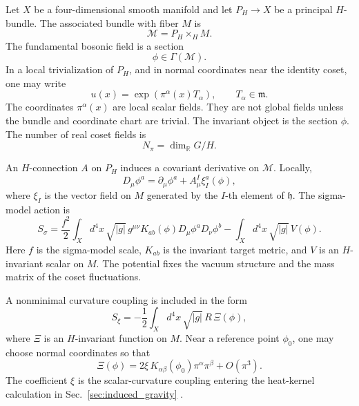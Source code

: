 \documentclass[aps,prd,preprint,longbibliography,nofootinbib,superscriptaddress,floatfix]{revtex4-2}
\begin{document}
Let \(X\) be a four-dimensional smooth manifold and let \(P_H\to X\) be a
principal \(H\)-bundle. The associated bundle with fiber \(M\) is
\begin{equation}
    \mathcal M
    =
    P_H\times_H M .
    \label{eq:ucft_associated_target_bundle}
\end{equation}
The fundamental bosonic field is a section
\begin{equation}
    \phi\in \Gamma(\mathcal M).
    \label{eq:ucft_field_section}
\end{equation}
In a local trivialization of \(P_H\), and in normal coordinates near the
identity coset, one may write
\begin{equation}
    u(x)
    =
    \exp\!\left(\pi^\alpha(x)T_\alpha\right),
    \qquad
    T_\alpha\in\mathfrak m .
    \label{eq:ucft_local_coordinates}
\end{equation}
The coordinates \(\pi^\alpha(x)\) are local scalar fields. They are not global
fields unless the bundle and coordinate chart are trivial. The invariant object
is the section \(\phi\). The number of real coset fields is
\begin{equation}
    N_\pi
    =
    \dim_{\mathbb R}G/H .
    \label{eq:ucft_number_fields}
\end{equation}

An \(H\)-connection \(A\) on \(P_H\) induces a covariant derivative on
\(\mathcal M\). Locally,
\begin{equation}
    D_\mu\phi^a
    =
    \partial_\mu\phi^a
    +
    A_\mu^I \xi_I^a(\phi),
    \label{eq:ucft_covariant_derivative}
\end{equation}
where \(\xi_I\) is the vector field on \(M\) generated by the \(I\)-th element
of \(\mathfrak h\). The sigma-model action is
\begin{equation}
    S_\sigma
    =
    \frac{f^2}{2}
    \int_X d^4x\,\sqrt{|g|}
    \,
    g^{\mu\nu}
    K_{ab}(\phi)
    D_\mu\phi^aD_\nu\phi^b
    -
    \int_X d^4x\,\sqrt{|g|}\,V(\phi).
    \label{eq:ucft_sigma_action}
\end{equation}
Here \(f\) is the sigma-model scale, \(K_{ab}\) is the invariant target metric,
and \(V\) is an \(H\)-invariant scalar on \(M\). The potential fixes the vacuum
structure and the mass matrix of the coset fluctuations.

A nonminimal curvature coupling is included in the form
\begin{equation}
    S_\xi
    =
    -\frac12
    \int_X d^4x\,\sqrt{|g|}
    \,
    R\,\Xi(\phi),
    \label{eq:ucft_nonminimal_action}
\end{equation}
where \(\Xi\) is an \(H\)-invariant function on \(M\). Near a reference point
\(\phi_0\), one may choose normal coordinates so that
\begin{equation}
    \Xi(\phi)
    =
    2\xi\,K_{\alpha\beta}(\phi_0)\pi^\alpha\pi^\beta
    +
    O(\pi^3).
    \label{eq:ucft_xi_expansion}
\end{equation}
The coefficient \(\xi\) is the scalar-curvature coupling entering the
heat-kernel calculation in Sec.~\ref{sec:induced_gravity}
\cite{BirrellDavies,GilkeyInvariance}.
\end{document}
